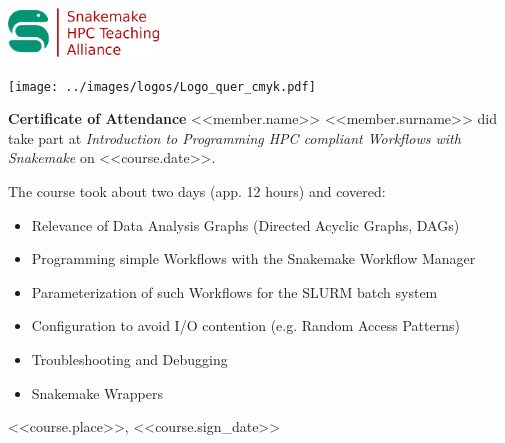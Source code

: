 \documentclass[a4paper,10pt]{article}
\begin{document}
\pagestyle{empty}
\begin{multicols}{2}
 \begin{minipage}{\textwidth}
  \includegraphics[width=4cm]{../images/logos/alliance_logo.png}
 \end{minipage}
  \begin{flushright}
     \texttt{[image: ../images/logos/Logo\_quer\_cmyk.pdf]}
 \end{flushright}
 \columnbreak
\end{multicols}


\begin{center}
 \vfill
 \huge{\bf Certificate of Attendance}
 \vfill
 \Large{<<member.name>> <<member.surname>>}
 \vfill
 did take part at 
 \vfill
 \emph{Introduction to Programming HPC compliant Workflows with Snakemake}
 \vfill
 on <<course.date>>.
 \vfill
\end{center}

The course took about two days (app. 12 hours) and covered:
\begin{itemize}
  \item Relevance of Data Analysis Graphs (Directed Acyclic Graphs, DAGs)
  \item Programming simple Workflows with the Snakemake Workflow Manager
  \item Parameterization of such Workflows for the SLURM batch system
  \item Configuration to avoid I/O contention (e.g. Random Access Patterns)
  \item Troubleshooting and Debugging
  \item Snakemake Wrappers
\end{itemize}

\vfill
<<course.place>>, <<course.sign_date>>
\end{document}
